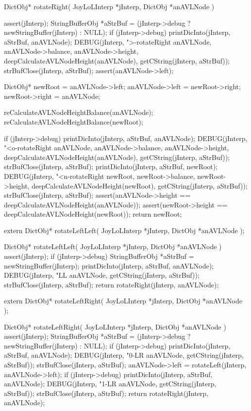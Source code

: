 \startCCode
DictObj* rotateRight(
  JoyLoLInterp *jInterp,
  DictObj      *anAVLNode
) {
  assert(jInterp);
  StringBufferObj *aStrBuf =
    (jInterp->debug ? newStringBuffer(jInterp) : NULL);
  if (jInterp->debug) {
    printDicInto(jInterp, aStrBuf, anAVLNode);
    DEBUG(jInterp, ">-rotateRight %
          anAVLNode, anAVLNode->balance, anAVLNode->height,
          deepCalculateAVLNodeHeight(anAVLNode),
          getCString(jInterp, aStrBuf));
    strBufClose(jInterp, aStrBuf);
  }
  assert(anAVLNode->left);

  DictObj* newRoot = anAVLNode->left;
  anAVLNode->left = newRoot->right;
  newRoot->right  = anAVLNode;

  reCalculateAVLNodeHeightBalance(anAVLNode);
  reCalculateAVLNodeHeightBalance(newRoot);

  if (jInterp->debug) {
    printDicInto(jInterp, aStrBuf, anAVLNode);
    DEBUG(jInterp, "<o-rotateRight %
          anAVLNode, anAVLNode->balance, anAVLNode->height,
          deepCalculateAVLNodeHeight(anAVLNode),
          getCString(jInterp, aStrBuf));
    strBufClose(jInterp, aStrBuf);
    printDicInto(jInterp, aStrBuf, newRoot);
    DEBUG(jInterp, "<n-rotateRight %
          newRoot, newRoot->balance, newRoot->height,
          deepCalculateAVLNodeHeight(newRoot),
          getCString(jInterp, aStrBuf));
    strBufClose(jInterp, aStrBuf);
  }
  assert(anAVLNode->height == deepCalculateAVLNodeHeight(anAVLNode));
  assert(newRoot->height == deepCalculateAVLNodeHeight(newRoot));
  return newRoot;
}
\stopCCode

\startCHeader
extern DictObj* rotateLeftLeft(
  JoyLoLInterp *jInterp,
  DictObj      *anAVLNode
);
\stopCHeader

\startCCode
DictObj* rotateLeftLeft(
  JoyLoLInterp *jInterp,
  DictObj      *anAVLNode
) {
  assert(jInterp);
  if (jInterp->debug) {
    StringBufferObj *aStrBuf = newStringBuffer(jInterp);
    printDicInto(jInterp, aStrBuf, anAVLNode);
    DEBUG(jInterp, "LL %
      anAVLNode, getCString(jInterp, aStrBuf));
    strBufClose(jInterp, aStrBuf);
  }
  return rotateRight(jInterp, anAVLNode);
}
\stopCCode

\startCHeader
extern DictObj* rotateLeftRight(
  JoyLoLInterp *jInterp,
  DictObj      *anAVLNode
);
\stopCHeader

\startCCode
DictObj* rotateLeftRight(
  JoyLoLInterp *jInterp,
  DictObj      *anAVLNode
) {
  assert(jInterp);
  StringBufferObj *aStrBuf =
    (jInterp->debug ? newStringBuffer(jInterp) : NULL);
  if (jInterp->debug) {
    printDicInto(jInterp, aStrBuf, anAVLNode);
    DEBUG(jInterp, "0-LR %
      anAVLNode, getCString(jInterp, aStrBuf));
    strBufClose(jInterp, aStrBuf);
  }
  anAVLNode->left = rotateLeft(jInterp, anAVLNode->left);
  if (jInterp->debug) {
    printDicInto(jInterp, aStrBuf, anAVLNode);
    DEBUG(jInterp, "1-LR %
      anAVLNode, getCString(jInterp, aStrBuf));
    strBufClose(jInterp, aStrBuf);
  }
  return rotateRight(jInterp, anAVLNode);
}
\stopCCode

